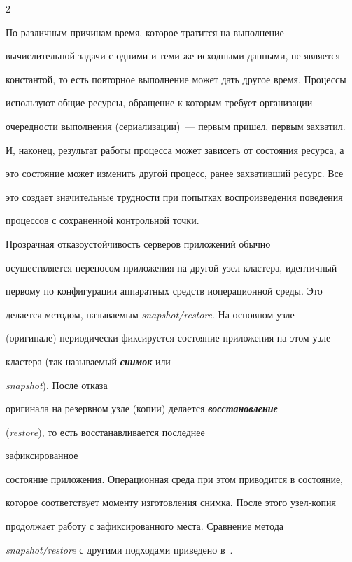 \begin{multicols}{2}
{\begin{itemize}
\end{itemize}



По различным  причинам время, которое тратится на выполнение

вычислительной задачи с одними и теми же исходными данными, не является

константой, то есть повторное выполнение может дать другое время. Процессы

используют общие ресурсы, обращение к которым требует организации

очередности выполнения (сериализации)~--- первым пришел, первым захватил.

И, наконец,  результат работы процесса может зависеть от состояния ресурса, а

это состояние может изменить другой процесс, ранее захвативший ресурс. Все

это создает значительные трудности при попытках воспроизведения поведения

процессов с сохраненной  контрольной точки.



Прозрачная отказоустойчивость серверов приложений обычно

осуществляется переносом при\-ло\-же\-ния на другой узел кластера, идентичный

первому по конфигурации аппаратных средств и\linebreak операционной среды. Это

делается методом, на\-зы\-ва\-емым \textit{snapshot/restore}. На основном узле

(оригинале)  периодически фиксируется состояние приложения на этом узле

кластера (так называемый {\bfseries\textit{снимок}} или

\textit{snapshot}). После отказа

оригинала на резервном узле (копии) делается {\bfseries\textit{восстановление}}

(\textit{restore}), то есть восстанавливается последнее

 зафиксированное

состояние приложения. Операционная среда при этом приводится в состояние,

которое соответствует моменту изготовления снимка. После этого узел-копия

продолжает работу с зафиксированного места.  Сравнение метода

\textit{snapshot/restore} с другими подходами приведено в~\cite{7zak}.



}
\end{multicols}
